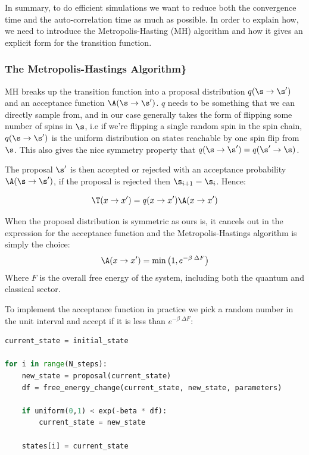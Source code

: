 In summary, to do efficient simulations we want to reduce both the convergence time and the auto-correlation time as much as possible. In order to explain how, we need to introduce the Metropolis-Hasting (MH) algorithm and how it gives an explicit form for the transition function.

\hypertarget{the-metropolis-hastings-algorithm}{%
\subsubsection{The Metropolis-Hastings Algorithm\}}\label{the-metropolis-hastings-algorithm}}

MH breaks up the transition function into a proposal distribution \(q(\s \to \s')\) and an acceptance function \(\A(\s \to \s')\). \(q\) needs to be something that we can directly sample from, and in our case generally takes the form of flipping some number of spins in \(\s\), i.e if we're flipping a single random spin in the spin chain, \(q(\s \to \s')\) is the uniform distribution on states reachable by one spin flip from \(\s\). This also gives the nice symmetry property that \(q(\s \to \s') = q(\s' \to \s)\).

The proposal \(\s'\) is then accepted or rejected with an acceptance probability \(\A(\s \to \s')\), if the proposal is rejected then \(\s_{i+1} = \s_{i}\). Hence:

\[\T(x\to x') = q(x\to x')\A(x \to x')\]

When the proposal distribution is symmetric as ours is, it cancels out in the expression for the acceptance function and the Metropolis-Hastings algorithm is simply the choice: \[ \A(x \to x') = \min\left(1, e^{-\beta\;\Delta F}\right)\] Where \(F\) is the overall free energy of the system, including both the quantum and classical sector.

To implement the acceptance function in practice we pick a random number in the unit interval and accept if it is less than \(e^{-\beta\;\Delta F}\):

\begin{lstlisting}[language=Python]
current_state = initial_state

for i in range(N_steps):
    new_state = proposal(current_state)
    df = free_energy_change(current_state, new_state, parameters)

    if uniform(0,1) < exp(-beta * df):
        current_state = new_state
        
    states[i] = current_state
\end{lstlisting}

